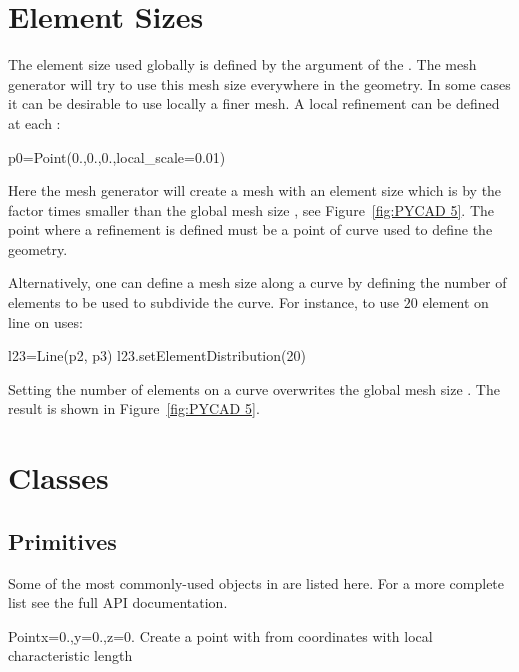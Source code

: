 \section{Element Sizes}
The element size used globally is defined by the 
 argument of the . The mesh generator 
will try to use this mesh size everywhere in the geometry. In some cases it can be 
desirable to use locally a finer mesh. A local refinement can be defined at each 
:
\begin{python}
p0=Point(0.,0.,0.,local_scale=0.01)
\end{python}
Here the mesh generator will create a mesh with an element size which is by the factor  
times smaller than the global mesh size , see Figure~\ref{fig:PYCAD 5}. The point where a refinement is defined must be a point of curve used to define the geometry. 

Alternatively, one can define a mesh size along a curve by defining the number of elements to be used to subdivide the curve. For instance, to use $20$ element on line  on uses:
\begin{python}
l23=Line(p2, p3)
l23.setElementDistribution(20)
\end{python}
Setting the number of elements on a curve overwrites the global mesh size . The result is shown in Figure~\ref{fig:PYCAD 5}. 



\section{\pycad Classes}

\subsection{Primitives}

Some of the most commonly-used objects in \pycad are listed here. For a more complete
list see the full API documentation.

\begin{classdesc}{Point}{x=0.,y=0.,z=0.}
Create a point with from coordinates with local characteristic length 
\end{classdesc}

